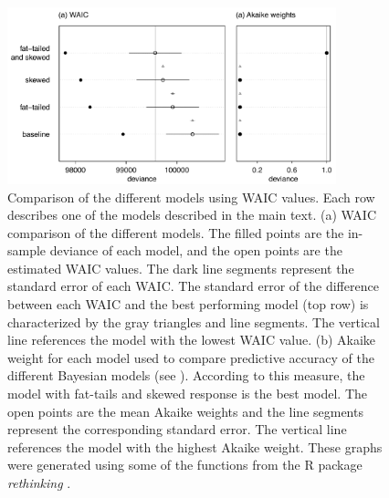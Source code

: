 \documentclass[11pt, a4paper]{article}
\begin{document}
\begin{figure}[ht]
  \centering
    \vspace{0.5cm}
    \includegraphics[width=0.85\textwidth]{figures/WAIC-plot}
    	  \vspace{0.3cm}
	   \caption{Comparison of the different models using WAIC values. Each row describes one of the models described in the main text. (a) WAIC comparison of the different models. The filled points are the in-sample deviance of each model, and the open points are the estimated WAIC values. The dark line segments represent the standard error of each WAIC. The standard error of the difference between each WAIC and the best performing model (top row) is characterized by the gray triangles and line segments. The vertical line references the model with the lowest WAIC value. (b) Akaike weight for each model used to compare predictive accuracy of the different Bayesian models (see \citealt{mcelreathStatisticalRethinkingBayesian2020}). According to this measure, the model with fat-tails and skewed response is the best model. The open points are the mean Akaike weights and the line segments represent the corresponding standard error. The vertical line references the model with the highest Akaike weight. These graphs were generated using some of the functions from the R package \textit{rethinking} \citep{mcelreathStatisticalRethinkingBayesian2020}.}
      \label{sfig:WAIC}
\end{figure}

\clearpage
\end{document}

